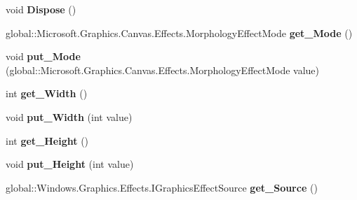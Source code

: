\begin{DoxyCompactItemize}
void {\bfseries Dispose} ()
\item 
\mbox{\label{class_microsoft_1_1_graphics_1_1_canvas_1_1_effects_1_1_morphology_effect_abdb13862f058bf5f7dade04433564b08}} 
global\+::\+Microsoft.\+Graphics.\+Canvas.\+Effects.\+Morphology\+Effect\+Mode {\bfseries get\+\_\+\+Mode} ()
\item 
\mbox{\label{class_microsoft_1_1_graphics_1_1_canvas_1_1_effects_1_1_morphology_effect_a296213a0672d2738d42d1fa293d9dd00}} 
void {\bfseries put\+\_\+\+Mode} (global\+::\+Microsoft.\+Graphics.\+Canvas.\+Effects.\+Morphology\+Effect\+Mode value)
\item 
\mbox{\label{class_microsoft_1_1_graphics_1_1_canvas_1_1_effects_1_1_morphology_effect_a6f97be0b87a082ba8cb4b9ebc4f89d70}} 
int {\bfseries get\+\_\+\+Width} ()
\item 
\mbox{\label{class_microsoft_1_1_graphics_1_1_canvas_1_1_effects_1_1_morphology_effect_ac3f128cf3f9dcffa2e7ed06b0a827404}} 
void {\bfseries put\+\_\+\+Width} (int value)
\item 
\mbox{\label{class_microsoft_1_1_graphics_1_1_canvas_1_1_effects_1_1_morphology_effect_abcfe446fe92397d1c11d0b6227c48e3e}} 
int {\bfseries get\+\_\+\+Height} ()
\item 
\mbox{\label{class_microsoft_1_1_graphics_1_1_canvas_1_1_effects_1_1_morphology_effect_a8952cddc9fba06db55a0f9b692f3a53d}} 
void {\bfseries put\+\_\+\+Height} (int value)
\item 
\mbox{\label{class_microsoft_1_1_graphics_1_1_canvas_1_1_effects_1_1_morphology_effect_a3a2a845c602a6a0210a1eec2fde425ce}} 
global\+::\+Windows.\+Graphics.\+Effects.\+I\+Graphics\+Effect\+Source {\bfseries get\+\_\+\+Source} ()
\item 

\end{DoxyCompactItemize}
